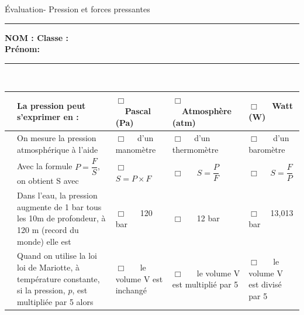 \documentclass[11pt,a4paper]{article}
\begin{document}
\noindent

\begin{center}
\LARGE{Évaluation- Pression et forces pressantes}\\[8mm]
\end{center}
\normalsize
\hrule 


\flushleft \textbf{NOM : \hfill Classe : \hspace{3cm} ~~\\[2mm]
Prénom:\\[0,4cm]
}
\hrule\
\\[0,2cm]

\vspace {8 mm}




    \begin{tabular}{p{2mm} p{5.5cm}|C{3cm}|C{3cm}|C{3cm}}
    

         & La pression peut s'exprimer en :& $\Box $ ~~Pascal (Pa) & $\Box $ ~~Atmosphère (atm)   & $\Box $ ~~Watt (W) \\
         \hline
       & On mesure la pression atmosphérique à l'aide   & $\Box $ ~~d'un manomètre & $\Box $ ~~d'un thermomètre  & $\Box $ ~~ d'un baromètre \\
        \hline
          & Avec la formule $P=\dfrac{F}{S}$, on obtient S avec  &$\Box $ ~~ $S=P \times F$  &$\Box $ ~~ $S=\dfrac{P}{F}$  & $\Box $ ~~$S=\dfrac{F}{P}$   \\
         \hline
          & Dans l'eau, la pression augmente de 1 bar tous les 10m de profondeur, à 120 m (record du monde)  elle est   &$\Box $ ~~ 120 bar &$\Box $ ~~ 12 bar & $\Box $ ~~13,013 bar \\

         \hline
         
         & Quand on utilise la loi loi de Mariotte, à température constante,  si la pression, $p$, est multipliée par 5 alors &$\Box $ ~~ le volume V est inchangé &$\Box $ ~~ le volume V est multiplié par 5  & $\Box $ ~~ le volume V est divisé par 5  \\

 
        
         \end{tabular}
\vspace{3mm}


\end{document}
